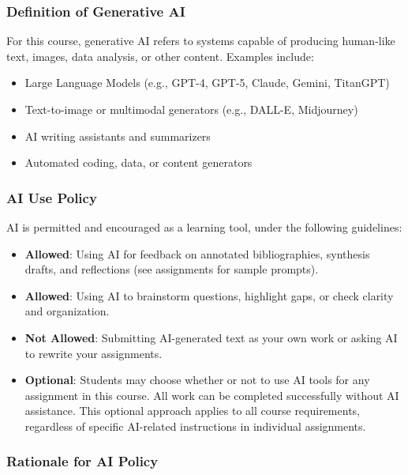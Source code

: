 \documentclass[12pt]{article}     %
\begin{document}
	\subsubsection*{Definition of Generative AI}
	
	\noindent For this course, generative AI refers to systems capable of producing human-like text, images, data analysis, or other content. Examples include:
	
	\begin{itemize}
	    \item Large Language Models (e.g., GPT-4, GPT-5, Claude, Gemini, TitanGPT)
	    \item Text-to-image or multimodal generators (e.g., DALL-E, Midjourney)
	    \item AI writing assistants and summarizers
	    \item Automated coding, data, or content generators
	\end{itemize}
	
	\subsubsection*{AI Use Policy}
	
	AI is permitted and encouraged as a learning tool, under the following guidelines:
	
	\begin{itemize}
	    \item \textbf{Allowed}: Using AI for feedback on annotated bibliographies, synthesis drafts, and reflections (see assignments for sample prompts).
	    \item \textbf{Allowed}: Using AI to brainstorm questions, highlight gaps, or check clarity and organization.
	    \item \textbf{Not Allowed}: Submitting AI-generated text as your own work or asking AI to rewrite your assignments.
	    \item \textbf{Optional}: Students may choose whether or not to use AI tools for any assignment in this course. All work can be completed successfully without AI assistance. This optional approach applies to all course requirements, regardless of specific AI-related instructions in individual assignments.
	\end{itemize}
	
	\subsubsection*{Rationale for AI Policy}
	
\end{document}

